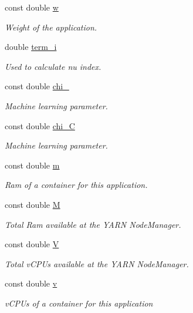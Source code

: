 \begin{DoxyCompactItemize}
const double \hyperlink{classApplication_a89e171cf287b09ce4b37dd94c0d61e2b}{w}
\begin{DoxyCompactList}\small\item\em Weight of the application. \end{DoxyCompactList}\item 
double \hyperlink{classApplication_ad5486702327ad61e56ed04fb54d58c20}{term\-\_\-i}
\begin{DoxyCompactList}\small\item\em Used to calculate nu index. \end{DoxyCompactList}\item 
const double \hyperlink{classApplication_a6066fad4c229a6035652efd712d0d78c}{chi\-\_}
\begin{DoxyCompactList}\small\item\em Machine learning parameter. \end{DoxyCompactList}\item 
const double \hyperlink{classApplication_a73d8a1604a2b2c99b14db1c8bd9c2798}{chi\-\_\-\-C}
\begin{DoxyCompactList}\small\item\em Machine learning parameter. \end{DoxyCompactList}\item 
const double \hyperlink{classApplication_ad95ca8809237917d16779d7ed0013c8e}{m}
\begin{DoxyCompactList}\small\item\em Ram of a container for this application. \end{DoxyCompactList}\item 
const double \hyperlink{classApplication_a98cc47f6aa4ac3c70133d2922952ef7a}{M}
\begin{DoxyCompactList}\small\item\em Total Ram available at the Y\-A\-R\-N Node\-Manager. \end{DoxyCompactList}\item 
const double \hyperlink{classApplication_a03a99fa3553c376653e53bb5f489c316}{V}
\begin{DoxyCompactList}\small\item\em Total v\-C\-P\-Us available at the Y\-A\-R\-N Node\-Manager. \end{DoxyCompactList}\item 
const double \hyperlink{classApplication_a57853498c230af817bc4173169847bfc}{v}
\begin{DoxyCompactList}\small\item\em v\-C\-P\-Us of a container for this application \end{DoxyCompactList}\item 

\end{DoxyCompactItemize}
